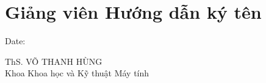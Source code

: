 \chapter*{Giảng viên Hướng dẫn ký tên}

\vspace{1cm}

\makebox[0.7\linewidth][l]{\hrulefill} Date: \makebox[0.2\linewidth][l]{\hrulefill}

    \begin{flushleft}
    ThS. VÕ THANH HÙNG\\
    Khoa Khoa học và Kỹ thuật Máy tính
    \end{flushleft}